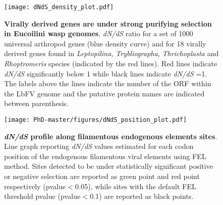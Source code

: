 \begin{figure}[!htpbt]
\texttt{[image: dNdS\_density\_plot.pdf]}\centering
\label{figure:dNdS_density_plot}
\caption[Paper3:Eucoilini filamentous EVE dN/dS mean distribution]{\textbf{Virally derived genes are under strong purifying selection in Eucoilini wasp genomes}. \textit{dN/dS} ratio for a set of 1000 universal arthropod genes (blue density curve) and for 18 virally derived genes found in \textit{Leptopilina}, \textit{Trybliographa}, \textit{Thrichoplasta} and \textit{Rhoptromeris} species (indicated by the red lines). Red lines indicate \textit{dN/dS} significantly below 1 while black lines indicate \textit{dN/dS} =1. The labels above the lines indicate the number of the ORF within the LbFV genome and the putative protein names are indicated between parenthesis.}
\end{figure}



\begin{figure}[!htpbt]
\texttt{[image: PhD-master/figures/dNdS\_position\_plot.pdf]}\centering
\caption[Paper3:Eucoilini filamentous EVE dN/dS distribution per site]{\textbf{\textit{dN/dS} profile along filamentous endogenous elements sites}. Line graph reporting \textit{dN/dS} values estimated for each codon position of the endogenous filamentous viral elements using FEL method. Sites detected to be under statistically significant positive or negative selection are reported as green point and red point  respectively (pvalue$<$0.05), while sites with the default FEL threshold pvalue (pvalue$<$0.1) are reported as black points.}
\label{figure:dNdS_position_plot}
\end{figure}




